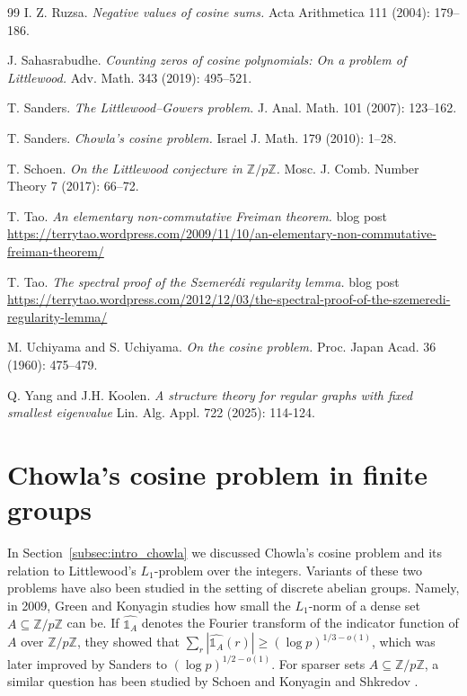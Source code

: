 \documentclass[11pt]{article}
\theoremstyle{plain}
\theoremstyle{definition}
\begin{document}
\begin{thebibliography}{99}
I. Z. Ruzsa.
\emph{Negative values of cosine sums.}
Acta Arithmetica 111 (2004): 179--186.

 J. Sahasrabudhe.
\emph{Counting zeros of cosine polynomials: On a problem of Littlewood.}
Adv. Math. 343 (2019): 495--521.

T. Sanders. 
\emph{The Littlewood--Gowers problem.}
J. Anal. Math. 101 (2007): 123--162.

T. Sanders.
\emph{Chowla's cosine problem.}
Israel J. Math. 179 (2010): 1--28.

T. Schoen. 
\emph{On the Littlewood conjecture in $\mathbb{Z}/p\mathbb{Z}$.}
Mosc. J. Comb. Number Theory 7 (2017): 66--72.

T. Tao. 
\emph{An elementary non-commutative Freiman theorem.} blog post
\url{https://terrytao.wordpress.com/2009/11/10/an-elementary-non-commutative-freiman-theorem/}

T. Tao. 
\emph{The spectral proof of the Szemer\'edi regularity lemma.} blog post
\url{https://terrytao.wordpress.com/2012/12/03/the-spectral-proof-of-the-szemeredi-regularity-lemma/}

 M. Uchiyama and S. Uchiyama. 
\emph{On the cosine problem.}
Proc. Japan Acad. 36 (1960): 475--479.


 Q. Yang and J.H. Koolen.
\emph{A structure theory for regular graphs with fixed smallest eigenvalue}
Lin. Alg. Appl. 722 (2025): 114-124.


\end{thebibliography}

\appendix

\section{Chowla's cosine problem in finite groups} \label{sec: chowla for groups}

In Section~\ref{subsec:intro_chowla} we discussed Chowla's cosine problem and its relation to Littlewood's $L_1$-problem over the integers. Variants of these two problems have also been studied in the setting of discrete abelian groups. Namely, in 2009, Green and Konyagin \cite{GK09} studies how small the $L_1$-norm of a dense set $A\subseteq \mathbb{Z}/p\mathbb{Z}$ can be. If $\widehat{\mathds{1}_A}$ denotes the Fourier transform of the indicator function of $A$ over $\mathbb{Z}/p\mathbb{Z}$, they showed that $\sum_{r}|\widehat{\mathds{1}_A}(r)|\geq (\log p)^{1/3-o(1)}$, which was later improved by Sanders \cite{S10} to $(\log p)^{1/2-o(1)}$. For sparser sets $A\subseteq \mathbb{Z}/p\mathbb{Z}$, a similar question has been studied by Schoen \cite{S17} and Konyagin and Shkredov \cite{KS16}. 
\end{document}
